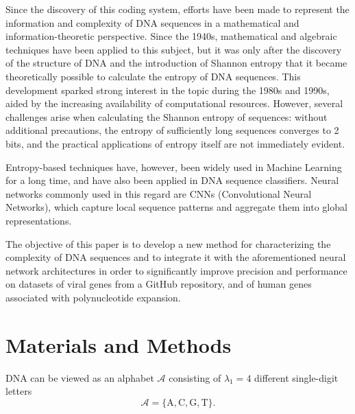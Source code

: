 \documentclass{article}
\theoremstyle{remark}
\begin{document}
Since the discovery of this coding system, efforts have been made to represent the information and complexity of DNA sequences in a mathematical and information-theoretic perspective\cite{ref3,ref4}. Since the 1940s, mathematical and algebraic techniques have been applied to this subject, but it was only after the discovery of the structure of DNA and the introduction of Shannon entropy that it became theoretically possible to calculate the entropy of DNA sequences\cite{ref4,ref5,ref6}. This development sparked strong interest in the topic during the 1980s and 1990s\cite{ref4,ref6,ref7}, aided by the increasing availability of computational resources. However, several challenges arise when calculating the Shannon entropy of sequences: without additional precautions, the entropy of sufficiently long sequences converges to 2 bits, and the practical applications of entropy itself are not immediately evident.

Entropy-based techniques have, however, been widely used in Machine Learning for a long time\cite{ref8,ref9}, and have also been applied in DNA sequence classifiers\cite{ref10,ref11}. Neural networks commonly used in this regard are CNNs (Convolutional Neural Networks), which capture local sequence patterns and aggregate them into global representations\cite{ref12,ref13}.

The objective of this paper is to develop a new method for characterizing the complexity of DNA sequences and to integrate it with the aforementioned neural network architectures in order to significantly improve precision and performance on datasets of viral genes from a GitHub repository\cite{ref14}, and of human genes associated with polynucleotide expansion\cite{ref15}.




\section{Materials and Methods}

DNA can be viewed as an alphabet \cite{ref6,ref16,ref17,ref18} $\mathcal{A}$ consisting of $\lambda_1 = 4$ different single-digit letters 
\begin{equation}
\mathcal{A} = \{\mathrm{A}, \mathrm{C}, \mathrm{G}, \mathrm{T}\}.
\end{equation}
\end{document}
